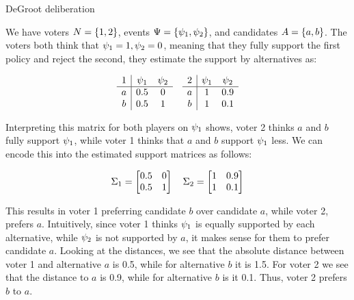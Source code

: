 \begin{example}{DeGroot deliberation} {}

We have voters \(N = \{1,2\}\), events \(\Psi =
\{\psi_{1}, \psi_{2}\}\), and candidates \(A =
\{a,b\}\). The voters both think that \(\psi_{1} = 1, \psi_{2} =
0\), meaning that they fully support the first policy and reject the
second, they estimate the support by alternatives as: 

\[
\begin{array}{c|cc} 
	1 & \psi_1 & \psi_2 \\ \hline 
	a & 0.5       & 0         \\ 
	b & 0.5       & 1           \\
\end{array}
\hspace{1em}
\begin{array}{c|cc} 
	2 & \psi_1 & \psi_2  \\ \hline 
	a & 1         & 0.9 \\
	b & 1         & 0.1       \\
\end{array} 
\] 

Interpreting this matrix for both players on $\psi_1$ shows, voter 2 thinks $a$ and $b$ fully support $\psi_1$, while voter 1 thinks that $a$ and $b$  support $\psi_1$ less. We can encode this into the estimated support matrices as follows:

\[ \Sigma_1 =\begin{bmatrix} 0.5 & 0 \\
0.5 & 1 \\ \end{bmatrix}\quad
\Sigma_2 =\begin{bmatrix} 1 & 0.9
\\ 1 & 0.1 \\ \end{bmatrix} \]

This results in voter 1 preferring candidate $b$ over candidate $a$, while
voter 2, prefers $a$. Intuitively, since voter 1 thinks $\psi_{1}$ is
equally supported by each alternative, while $\psi_{2}$ is not supported by
$a$, it makes sense for them to prefer candidate $a$. Looking at the distances,
we see that the absolute distance between voter 1 and alternative $a$ is 0.5,
while for alternative $b$ it is 1.5. For voter 2 we see that the distance to
$a$ is 0.9, while for alternative $b$ is it 0.1. Thus, voter 2 prefers $b$ to
$a$.


\end{example}
